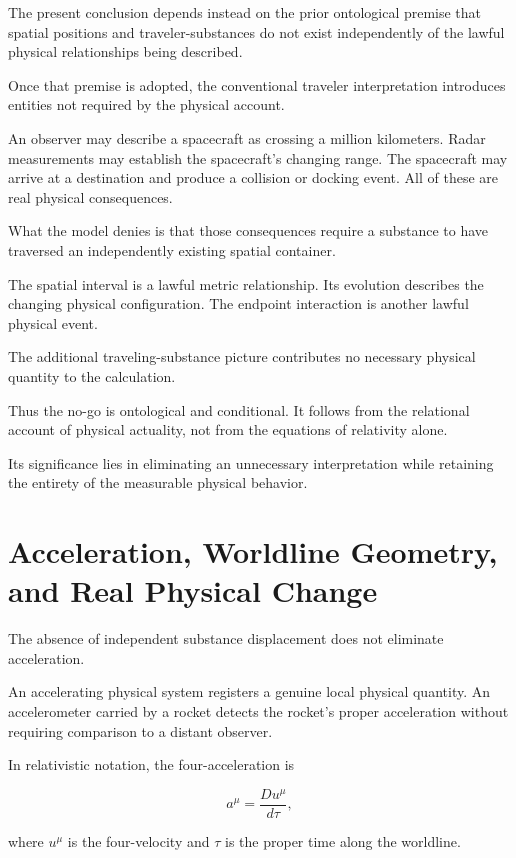 \documentclass[12pt,onecolumn]{article}
\begin{document}
The present conclusion depends instead on the prior ontological premise that spatial positions and traveler-substances do not exist independently of the lawful physical relationships being described.

Once that premise is adopted, the conventional traveler interpretation introduces entities not required by the physical account.

An observer may describe a spacecraft as crossing a million kilometers. Radar measurements may establish the spacecraft's changing range. The spacecraft may arrive at a destination and produce a collision or docking event. All of these are real physical consequences.

What the model denies is that those consequences require a substance to have traversed an independently existing spatial container.

The spatial interval is a lawful metric relationship. Its evolution describes the changing physical configuration. The endpoint interaction is another lawful physical event.

The additional traveling-substance picture contributes no necessary physical quantity to the calculation.

Thus the no-go is ontological and conditional. It follows from the relational account of physical actuality, not from the equations of relativity alone.

Its significance lies in eliminating an unnecessary interpretation while retaining the entirety of the measurable physical behavior.

\section{Acceleration, Worldline Geometry, and Real Physical Change}

The absence of independent substance displacement does not eliminate acceleration.

An accelerating physical system registers a genuine local physical quantity. An accelerometer carried by a rocket detects the rocket's proper acceleration without requiring comparison to a distant observer.

In relativistic notation, the four-acceleration is

\begin{equation}
a^\mu=\frac{D u^\mu}{d\tau},
\end{equation}

where \(u^\mu\) is the four-velocity and \(\tau\) is the proper time along the worldline.
\end{document}
